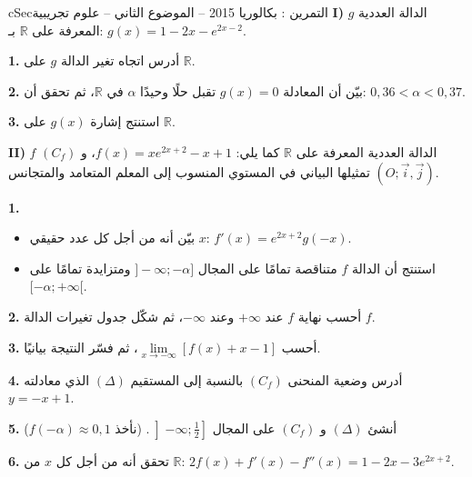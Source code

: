 \documentclass[12pt,a4paper]{article}
\newenvironment{BOX}[2]{\begin{otherlanguage}{english}\begin{arbox}{#1}{#2}}{\end{arbox}\end{otherlanguage}}
\newcounter{exo}
\newenvironment{tamrin}[1]{\stepcounter{exo}\begin{BOX}{cSec}{التمرين \theexo: #1}}{\end{BOX}}
\newcommand{\R}{\mathbb{R}}
\newenvironment{sq}{\begin{itemize}[leftmargin=2.4em,itemsep=3pt]}{\end{itemize}}
\newcommand{\qa}{\item[(أ)]}\newcommand{\qb}{\item[(ب)]}\newcommand{\qc}{\item[(جـ)]}\newcommand{\qd}{\item[(د)]}\newcommand{\qe}{\item[(هـ)]}
\newcommand{\QQ}[1]{\par\smallskip\textbf{#1.} }
\begin{document}
\begin{tamrin}{بكالوريا 2015 -- الموضوع الثاني -- علوم تجريبية}
\textbf{I)} $g$ الدالة العددية المعرفة على $\R$ بـ: $g(x)=1-2x-e^{2x-2}$.

\QQ{1} أدرس اتجاه تغير الدالة $g$ على $\R$.
\QQ{2} بيّن أن المعادلة $g(x)=0$ تقبل حلًا وحيدًا $\alpha$ في $\R$، ثم تحقق أن: $0{,}36<\alpha<0{,}37$.
\QQ{3} استنتج إشارة $g(x)$ على $\R$.

\textbf{II)} $f$ الدالة العددية المعرفة على $\R$ كما يلي: $f(x)=xe^{2x+2}-x+1$، و $(C_f)$ تمثيلها البياني في المستوي المنسوب إلى المعلم المتعامد والمتجانس $(O;\vec i,\vec j)$.

\QQ{1}
\begin{sq}
\qa بيّن أنه من أجل كل عدد حقيقي $x$: $f'(x)=e^{2x+2}g(-x)$.
\qb استنتج أن الدالة $f$ متناقصة تمامًا على المجال $]{-}\infty;-\alpha]$ ومتزايدة تمامًا على $[-\alpha;+\infty[$.
\end{sq}
\QQ{2} أحسب نهاية $f$ عند $+\infty$ وعند $-\infty$، ثم شكّل جدول تغيرات الدالة $f$.
\QQ{3} أحسب $\lim\limits_{x\to-\infty}\left[f(x)+x-1\right]$، ثم فسّر النتيجة بيانيًا.
\QQ{4} أدرس وضعية المنحنى $(C_f)$ بالنسبة إلى المستقيم $(\Delta)$ الذي معادلته $y=-x+1$.
\QQ{5} أنشئ $(\Delta)$ و $(C_f)$ على المجال $\left]{-}\infty;\frac12\right]$. (نأخذ $f(-\alpha)\approx0{,}1$)
\QQ{6} تحقق أنه من أجل كل $x$ من $\R$: $2f(x)+f'(x)-f''(x)=1-2x-3e^{2x+2}$.
\end{tamrin}
\end{document}
